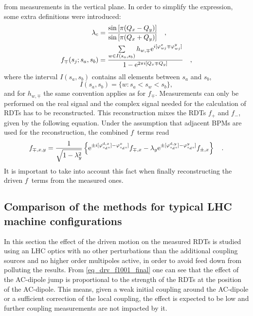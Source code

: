 %
from measurements in the vertical plane.
In order to simplify the expression, some extra definitions were introduced:
%
\begin{align}
    \lambda_c &= \frac{\sin\left[\pi(Q_x-Q_y)\right]}{\sin\left[\pi(Q_x+Q_y)\right]}\quad ,
    \notag \\
    f_{\mp}(s_j;s_a,s_b) &= \frac{
        \sum\limits_{w\in I(s_a,s_b)} h_{w,\mp}\text{e}^{i[\varphi_{wj}^x \mp \varphi_{wj}^y]}
    }{
        1-\text{e}^{2\pi i [Q_x\mp Q_y]}
    }\quad ,
\end{align}
%
where the interval $I(s_a,s_b)$  contains all elements between $s_a$ and $s_b$,
%
\begin{equation}
    I(s_a,s_b) = \{w: s_a < s_w < s_b\},
\end{equation}
%
and for $h_{w,\mp}$ the same convention applies as for $f_\mp$.
Measurements can only be performed on the real signal and the complex signal needed for the calculation
of RDTs has to be reconstructed.  
This reconstruction mixes the RDTs $f_+$ and $f_-$, given by the following equation. Under the assumption
that adjacent BPMs are used for the reconstruction, the combined $f$~terms read
%
\begin{align}
   f_{\mp,x,y} = \frac{1}{\sqrt{1-\lambda_y^2}}
   \left\{
       \text{e}^{\pm i [\varphi^{\text{d},x}_{s_ds}] - \varphi^{x}_{s_ds}]}f_{\mp,x}
       - \lambda_y\text{e}^{\pm[\varphi^{\text{d},y}_{s_ds}] - \varphi^{y}_{s_ds}]}f_{\pm,x}
    \right\}
    \quad .
\end{align}
%
It is important to take into account this fact when finally reconstructing the driven $f$~terms from
the measured ones.

\subsection{Comparison of the methods for typical LHC machine configurations}

In this section the effect of the driven motion on the measured RDTs is studied using an LHC optics with no other
perturbations than the additional coupling sources and no higher order multipoles active, in order to avoid feed
down from polluting the results.
From \eqref{eq_drv_f1001_final} one can see that the effect of the AC-dipole jump is proportional to
the strength of the RDTs at the  position of the AC-dipole.
This means, given a weak initial coupling around the AC-dipole or a sufficient
correction of the local coupling, the effect is expected to be low and further coupling measurements
are not impacted by it. 

